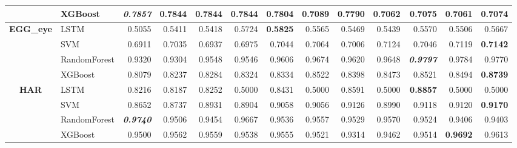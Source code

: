 \begin{table}[H]
\begin{adjustbox}{max width=12cm}
\begin{tabular}{|c|l|r|r|r|r|r|r|r|r|r|r|r|}
			                      & XGBoost      & \textit{\textbf{0.7857}} & 0.7844          & 0.7844                   & 0.7844                   & 0.7804          & 0.7089                   & 0.7790 & 0.7062 & 0.7075                   & 0.7061          & 0.7074          \\
			\hline
			\textbf{EGG\_eye}     & LSTM         & 0.5055                   & 0.5411          & 0.5418                   & 0.5724                   & \textbf{0.5825} & 0.5565                   & 0.5469 & 0.5439 & 0.5570                   & 0.5506          & 0.5667          \\
			                      & SVM          & 0.6911                   & 0.7035          & 0.6937                   & 0.6975                   & 0.7044          & 0.7064                   & 0.7006 & 0.7124 & 0.7046                   & 0.7119          & \textbf{0.7142} \\
			                      & RandomForest & 0.9320                   & 0.9304          & 0.9548                   & 0.9546                   & 0.9606          & 0.9674                   & 0.9620 & 0.9648 & \textit{\textbf{0.9797}} & 0.9784          & 0.9770          \\
			                      & XGBoost      & 0.8079                   & 0.8237          & 0.8284                   & 0.8324                   & 0.8334          & 0.8522                   & 0.8398 & 0.8473 & 0.8521                   & 0.8494          & \textbf{0.8739} \\
			\hline
			\textbf{HAR}          & LSTM         & 0.8216                   & 0.8187          & 0.8252                   & 0.5000                   & 0.8431          & 0.5000                   & 0.8591 & 0.5000 & \textbf{0.8857}          & 0.5000          & 0.5000          \\
			                      & SVM          & 0.8652                   & 0.8737          & 0.8931                   & 0.8904                   & 0.9058          & 0.9056                   & 0.9126 & 0.8990 & 0.9118                   & 0.9120          & \textbf{0.9170} \\
			                      & RandomForest & \textit{\textbf{0.9740}} & 0.9506          & 0.9454                   & 0.9667                   & 0.9536          & 0.9557                   & 0.9529 & 0.9570 & 0.9524                   & 0.9406          & 0.9403          \\
			                      & XGBoost      & 0.9500                   & 0.9562          & 0.9559                   & 0.9538                   & 0.9555          & 0.9521                   & 0.9314 & 0.9462 & 0.9514                   & \textbf{0.9692} & 0.9613          \\

\end{tabular}
\end{adjustbox}
\end{table}
